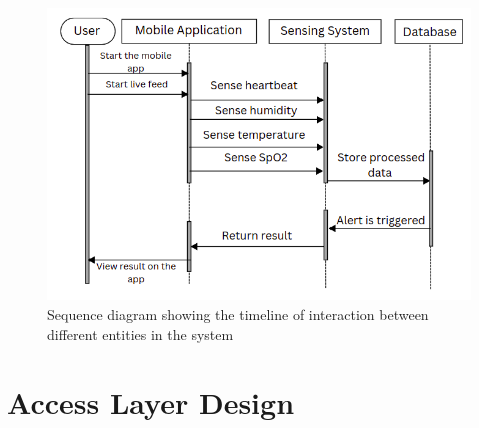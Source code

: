 \documentclass[12pt,a4paper]{report}
\begin{document}
\begin{figure}[hbtp]
  \centering
  \includegraphics[scale=0.6]{./pic/sequence.png}
  \caption{Sequence diagram showing the timeline of interaction between different entities in the system}
  \label{fig:sequence}
\end{figure}

\section{Access Layer Design}
\end{document}
